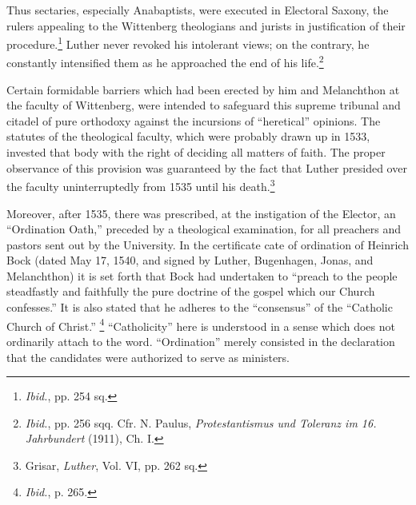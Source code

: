 Thus sectaries, especially Anabaptists, were executed in Electoral
Saxony, the rulers appealing to the Wittenberg theologians and jurists
in justification of their procedure.\footnote{\textit{Ibid.}, pp. 254 sq.}
 Luther never revoked his intolerant
views; on the contrary, he constantly intensified them as he
approached the end of his life.\footnote
{\textit{Ibid.}, pp. 256 sqq. Cfr. N. Paulus, \textit{Protestantismus und Toleranz im 16. Jahrbundert}
(1911), Ch. I.}

Certain formidable barriers which had been erected by him and
Melanchthon at the faculty of Wittenberg, were intended to safeguard this
supreme tribunal and citadel of pure orthodoxy against
the incursions of “heretical” opinions. The statutes of the theological
faculty, which were probably drawn up in 1533, invested that body
with the right of deciding all matters of faith. The proper observance
of this provision was guaranteed by the fact that Luther presided
over the faculty uninterruptedly from 1535 until his death.\footnote
{Grisar, \textit{Luther}, Vol. VI, pp. 262 sq.}

Moreover, after 1535, there was prescribed, at the instigation of the Elector,
an “Ordination Oath,” preceded by a theological examination,
for all preachers and pastors sent out by the University. In the certificate
cate of ordination of Heinrich Bock (dated May 17, 1540, and signed
by Luther, Bugenhagen, Jonas, and Melanchthon) it is set forth that
Bock had undertaken to “preach to the people steadfastly and faithfully
the pure doctrine of the gospel which our Church confesses.”
It is also stated that he adheres to the “consensus” of the “Catholic
Church of Christ.”
\footnote{\textit{Ibid.}, p. 265.}
“Catholicity” here is understood in a sense
which does not ordinarily attach to the word. “Ordination” merely
consisted in the declaration that the candidates were authorized to
serve as ministers.

